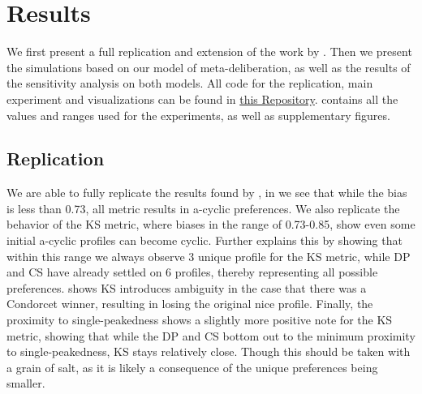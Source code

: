 \newpage
\chapter{Results}
\label{experiment_results}
We first present a full replication and extension of the work by
\citet{radDeliberationSinglePeakednessCoherent2021}. Then we present the simulations based on our model of
meta-deliberation, as well as the results of the sensitivity analysis on both
models. All code for the replication, main experiment and visualizations can be
found in \href{https://github.com/amirsahrani/master_thesis}{this Repository}.  contains all the values and ranges used for the experiments, as well as supplementary figures.


\section{Replication}\label{sec: replication} We are able to fully replicate the results found by
\citet{radDeliberationSinglePeakednessCoherent2021},  in 
we see that while the bias is less than 0.73, all metric results in a-cyclic
preferences. We also replicate the behavior of the KS metric, where biases in
the range of 0.73-0.85, show even some initial a-cyclic profiles can become
cyclic.  Further explains this by showing that within this
range we always observe 3 unique profile for the KS metric, while DP and CS
have already settled on 6 profiles, thereby representing all possible
preferences.  shows KS introduces ambiguity in the case
that there was a Condorcet winner, resulting in losing the original nice
profile. Finally, the proximity to single-peakedness shows a slightly more
positive note for the KS metric, showing that while the DP and CS bottom out to
the minimum proximity to single-peakedness, KS stays relatively close. Though
this should be taken with a grain of salt, as it is likely a consequence of the
unique preferences being smaller.

